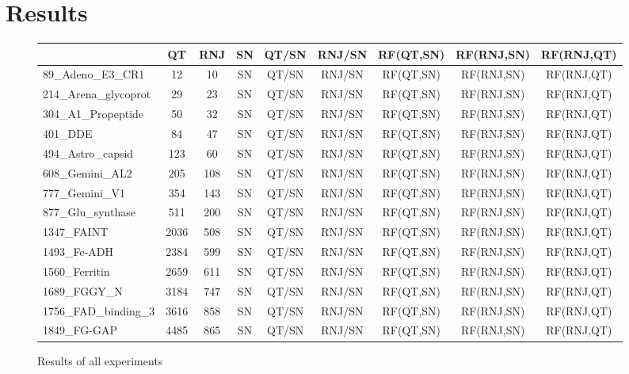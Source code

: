 \documentclass[a4paper,oneside,article,11pt]{memoir}
\begin{document}
\chapter*{Results}
\begin{figure}[H]
\begin{adjustwidth}{-2.3cm}{}
\begin{tabular}{l|c|c|c|c|c|c|c|c}
	& QT & RNJ & SN & QT/SN & RNJ/SN & RF(QT,SN) & RF(RNJ,SN) & RF(RNJ,QT) \\\hline
89\_Adeno\_E3\_CR1 & 12 & 10 & SN & QT/SN & RNJ/SN & RF(QT,SN) & RF(RNJ,SN) & RF(RNJ,QT) \\\hline
214\_Arena\_glycoprot & 29 & 23 & SN & QT/SN & RNJ/SN & RF(QT,SN) & RF(RNJ,SN) & RF(RNJ,QT) \\\hline
304\_A1\_Propeptide & 50 & 32 & SN & QT/SN & RNJ/SN & RF(QT,SN) & RF(RNJ,SN) & RF(RNJ,QT) \\\hline
401\_DDE & 84 & 47 & SN & QT/SN & RNJ/SN & RF(QT,SN) & RF(RNJ,SN) & RF(RNJ,QT) \\\hline
494\_Astro\_capsid & 123 & 60 & SN & QT/SN & RNJ/SN & RF(QT,SN) & RF(RNJ,SN) & RF(RNJ,QT) \\\hline
608\_Gemini\_AL2 & 205 & 108 & SN & QT/SN & RNJ/SN & RF(QT,SN) & RF(RNJ,SN) & RF(RNJ,QT) \\\hline
777\_Gemini\_V1 & 354 & 143 & SN & QT/SN & RNJ/SN & RF(QT,SN) & RF(RNJ,SN) & RF(RNJ,QT) \\\hline
877\_Glu\_synthase & 511 & 200 & SN & QT/SN & RNJ/SN & RF(QT,SN) & RF(RNJ,SN) & RF(RNJ,QT) \\\hline
1347\_FAINT & 2036 & 508 & SN & QT/SN & RNJ/SN & RF(QT,SN) & RF(RNJ,SN) & RF(RNJ,QT) \\\hline
1493\_Fe-ADH & 2384 & 599 & SN & QT/SN & RNJ/SN & RF(QT,SN) & RF(RNJ,SN) & RF(RNJ,QT) \\\hline
1560\_Ferritin & 2659 & 611 & SN & QT/SN & RNJ/SN & RF(QT,SN) & RF(RNJ,SN) & RF(RNJ,QT) \\\hline
1689\_FGGY\_N & 3184 & 747 & SN & QT/SN & RNJ/SN & RF(QT,SN) & RF(RNJ,SN) & RF(RNJ,QT) \\\hline
1756\_FAD\_binding\_3 & 3616 & 858 & SN & QT/SN & RNJ/SN & RF(QT,SN) & RF(RNJ,SN) & RF(RNJ,QT) \\\hline
1849\_FG-GAP & 4485 & 865 & SN & QT/SN & RNJ/SN & RF(QT,SN) & RF(RNJ,SN) & RF(RNJ,QT)
\end{tabular}
\caption{\label{tab:results}Results of all experiments}
\end{adjustwidth}
\end{figure}


\end{document}
